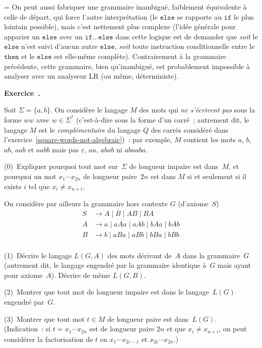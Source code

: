 \documentclass[12pt,a4paper]{article}
\theoremstyle{definition}
\newcommand\exercice{%
\refstepcounter{comcnt}\bigskip\noindent\textbf{Exercice~\thecomcnt.}}
\newif\ifcorrige
\newenvironment{corrige}%
{\ifcorrige\relax\else\setbox0=\vbox\bgroup\fi%
\smallbreak\footnotesize\noindent{\underbar{\textit{Corrigé.}}\quad}}
{{\hbox{}\nobreak\hfill\checkmark}%
\ifcorrige\relax\else\egroup\fi\par}
\begin{document}
\begin{corrige}
On peut aussi fabriquer une grammaire inambiguë, faiblement
équivalente à celle de départ, qui force l'autre interprétation (le
$\mathtt{else}$ se rapporte au $\mathtt{if}$ le plus lointain
possible), mais c'est nettement plus complexe (l'idée générale pour
apparier un $\mathtt{else}$ avec un $\mathtt{if}...\mathtt{else}$ dans
cette logique est de demander que \emph{soit} le $\mathtt{else}$ n'est
suivi d'aucun autre $\mathtt{else}$, \emph{soit} toute instruction
conditionnelle entre le $\mathtt{then}$ et le $\mathtt{else}$ est
elle-même complète).  Contrairement à la grammaire précédente, cette
grammaire, bien qu'inambiguë, est probablement impossible à analyser
avec un analyseur LR (ou même, déterministe).
\end{corrige}


%

\exercice\label{non-square-words-is-algebraic}

Soit $\Sigma = \{a,b\}$.  On considère le langage $M$ des mots qui
\emph{ne s'écrivent pas} sous la forme $ww$ avec $w\in\Sigma^*$
(c'est-à-dire sous la forme d'un carré ; autrement dit, le langage $M$
est le \emph{complémentaire} du langage $Q$ des carrés considéré dans
l'exercice \ref{square-words-not-algebraic}) : par exemple, $M$
contient les mots $a$, $b$, $ab$, $aab$ et $aabb$ mais pas
$\varepsilon$, $aa$, $abab$ ni $abaaba$.

(0) Expliquer pourquoi tout mot sur $\Sigma$ de longueur impaire est
dans $M$, et pourquoi un mot $x_1\cdots x_{2n}$ de longueur paire $2n$
est dans $M$ si et seulement si il existe $i$ tel que $x_i \neq
x_{n+i}$.

On considère par ailleurs la grammaire hors contexte $G$
(d'axiome $S$)
\[
\begin{aligned}
S &\rightarrow A \;|\; B \;|\; AB \;|\; BA\\
A &\rightarrow a \;|\; aAa \;|\; aAb \;|\; bAa \;|\; bAb\\
B &\rightarrow b \;|\; aBa \;|\; aBb \;|\; bBa \;|\; bBb\\
\end{aligned}
\]

(1) Décrire le langage $L(G,A)$ des mots dérivant de $A$ dans la
grammaire $G$ (autrement dit, le langage engendré par la grammaire
identique à $G$ mais ayant pour axiome $A$).  Décrire de même
$L(G,B)$.

(2) Montrer que tout mot de longueur impaire est dans le
langage $L(G)$ engendré par $G$.

(3) Montrer que tout mot $t \in M$ de longueur paire est dans $L(G)$.
(Indication : si $t = x_1\cdots x_{2n}$ est de longueur paire $2n$ et
que $x_i \neq x_{n+i}$, on peut considérer la factorisation de $t$ en
$x_1\cdots x_{2i-1}$ et $x_{2i}\cdots x_{2n}$.)
\end{document}
